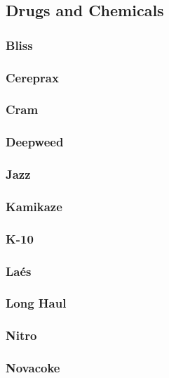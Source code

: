 \subsection{Drugs and Chemicals}

\subsubsection{Bliss}

\subsubsection{Cereprax}

\subsubsection{Cram}

\subsubsection{Deepweed}

\subsubsection{Jazz}

\subsubsection{Kamikaze}

\subsubsection{K-10}

\subsubsection{Laés}

\subsubsection{Long Haul}

\subsubsection{Nitro}

\subsubsection{Novacoke}

